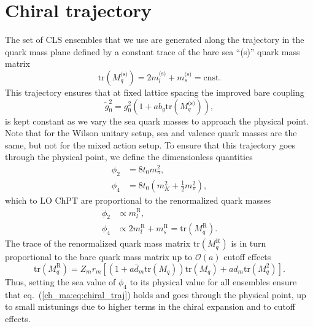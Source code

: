 \section{Chiral trajectory}
\label{ch_ma:sec:chiral_traj}

The set of CLS ensembles that we use are generated along the trajectory in the quark mass plane defined by a constant trace of the bare sea ``(s)'' quark mass matrix
\begin{equation}
\label{ch_ma:eq:chiral_traj}
{\textrm{tr}}\left(M_q^{\textrm{(s)}}\right)=2m_l^{\textrm{(s)}}+m_s^{\textrm{(s)}}={\textrm{cnst}}.
\end{equation}
This trajectory ensures that at fixed lattice spacing the improved bare coupling 
\begin{equation}
\tilde{g}_0^2=g_0^2\left(1+ab_g{\textrm{tr}}\left(M_q^{\textrm{(s)}}\right)\right),
\end{equation}
is kept constant as we vary the sea quark masses to approach the physical point. Note that for the Wilson unitary setup, sea and valence quark masses are the same, but not for the mixed action setup. To ensure that this trajectory goes through the physical point, we define the dimensionless quantities
\begin{align}
\label{ch_ma:eq:phis}
\phi_2&=8t_0m_{\pi}^2,\\
\phi_4&=8t_0\left(m_K^2+\frac{1}{2}m_{\pi}^2\right),
\end{align}
which to LO ChPT are proportional to the renormalized quark masses
\begin{align}
\phi_2&\propto m_l^{\textrm{R}},\\
\phi_4&\propto2m_l^{\textrm{R}}+m_s^{\textrm{R}}={\textrm{tr}}\left(M_q^{\textrm{R}}\right).
\end{align}
The trace of the renormalized quark mass matrix ${\textrm{tr}}\left(M_q^{\textrm{R}}\right)$ is in turn proportional to the bare quark mass matrix up to $\mathcal{O}(a)$ cutoff effects
\begin{equation}
{\textrm{tr}}\left(M_q^{\textrm{R}}\right)=Z_mr_m\left[\left(1+a\bar{d}_m{\textrm{tr}}\left(M_q\right)\right){\textrm{tr}}\left(M_q\right)+ad_m{\textrm{tr}}\left(M_q^2\right)\right].
\end{equation}
Thus, setting the sea value of $\phi_4$ to its physical value for all ensembles ensure that eq.~(\ref{ch_ma:eq:chiral_traj}) holds and goes through the physical point, up to small mistunings due to higher terms in the chiral expansion and to cutoff effects. 

